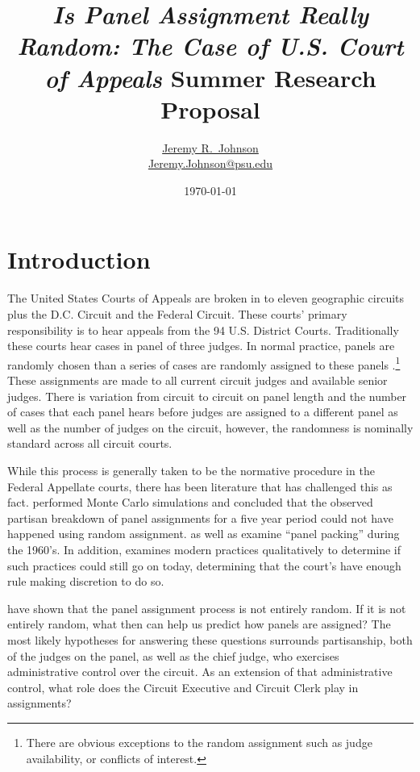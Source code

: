 \documentclass[12pt]{article}
\title{\textit{Is Panel Assignment Really Random: The Case of U.S. Court of Appeals} Summer Research Proposal}
\author{\href{http://www.jeremyrjohnson.org/}{Jeremy R.\ Johnson}\\ \href{mailto:Jeremy.Johnson@psu.edu}{Jeremy.Johnson@psu.edu}}
\affil{Pennsylvania State University}
\date{\today}
\begin{document}
\maketitle
\thispagestyle{empty}
\pagebreak

\singlespacing
\setcounter{page}{1}

\section*{Introduction}
The United States Courts of Appeals are broken in to eleven geographic circuits plus the D.C. Circuit and the Federal Circuit.  These courts' primary responsibility is to hear appeals from the 94 U.S. District Courts.  Traditionally these courts hear cases in panel of three judges.  In normal practice, panels are randomly chosen than a series of cases are randomly assigned to these panels \citep{Hooper2011, Journalist2011,Chilton2014,Songer2007}.\footnote{There are obvious exceptions to the random assignment such as judge availability, or conflicts of interest.}  These assignments are made to all current circuit judges and available senior judges.  There is variation from circuit to circuit on panel length and the number of cases that each panel hears before judges are assigned to a different panel as well as the number of judges on the circuit, however, the randomness is nominally standard across all circuit courts.  

While this process is generally taken to be the normative procedure in the Federal Appellate courts, there has been literature that has challenged this as fact.  \citet{Chilton2014} performed Monte Carlo simulations and concluded that the observed partisan breakdown of panel assignments for a five year period could not have happened using random assignment.  \citet{Atkins1974} as well as \citet{Brown2000} examine ``panel packing'' during the 1960's.  In addition, \citet{Brown2000} examines modern practices qualitatively to determine if such practices could still go on today, determining that the court's have enough rule making discretion to do so.

\citet{Chilton2014} have shown that the panel assignment process is not entirely random.  If it is not entirely random, what then can help us predict how panels are assigned?  The most likely hypotheses for answering these questions surrounds partisanship, both of the judges on the panel, as well as the chief judge, who exercises administrative control over the circuit.  As an extension of that administrative control, what role does the Circuit Executive and Circuit Clerk play in assignments?
\end{document}
